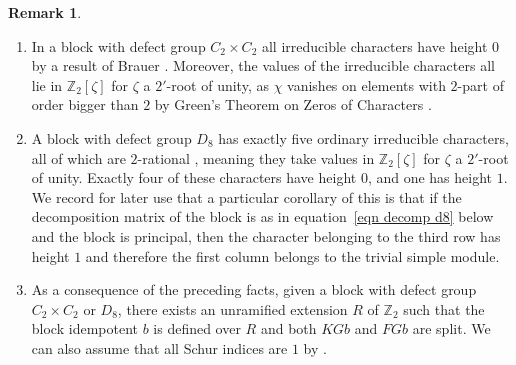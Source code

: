 \documentclass[11pt, a4paper]{amsart}
\theoremstyle{definition}
\theoremstyle{definition}
\newtheorem{remark}[theorem]{Remark}
\newcommand{\Z}{\mathbb Z}
\newcommand{\PSL}{{\operatorname{PSL}}}
\begin{document}


\begin{remark}\label{rem:Height0AndSplit}
    \begin{enumerate}
        \item
        In a block with defect group $C_2 \times C_2$ all irreducible characters have height $0$ by a result of Brauer \cite[Corollary 12.1.5]{LinckelmannVol2}. Moreover, the values of the irreducible characters all lie in $\mathbb{Z}_2[\zeta]$ for $\zeta$ a $2'$-root of unity, as $\chi$ vanishes on elements with $2$-part of order bigger than $2$ by Green's Theorem on Zeros of Characters \cite[Theorem 19.27]{CurtisReinerI}.
        \item A block with defect group $D_8$ has exactly five ordinary irreducible characters, all of which are $2$-rational \cite[Theorem 3]{BrauerDihedralDefect}, meaning they take values in $\mathbb{Z}_2[\zeta]$ for $\zeta$ a $2'$-root of unity. Exactly four of these characters have height $0$, and one  has height $1$. We record for later use that a particular corollary of this is that if the decomposition matrix of the block is as in equation~\eqref{eqn decomp d8} below and the block is principal, then the character belonging to the third row has height $1$ and therefore the first column belongs to the trivial simple module.
        \item As a consequence of the preceding facts, given a block with defect group $C_2\times C_2$ or $D_8$, there exists an unramified extension $R$ of $\Z_2$ such that the block idempotent $b$ is defined over $R$ and both $KGb$ and $FGb$ are split. We can also assume that all Schur indices are $1$ by \cite[IV, Theorem 9.2]{Feit}.
    \end{enumerate}
\end{remark}    
\end{document}
